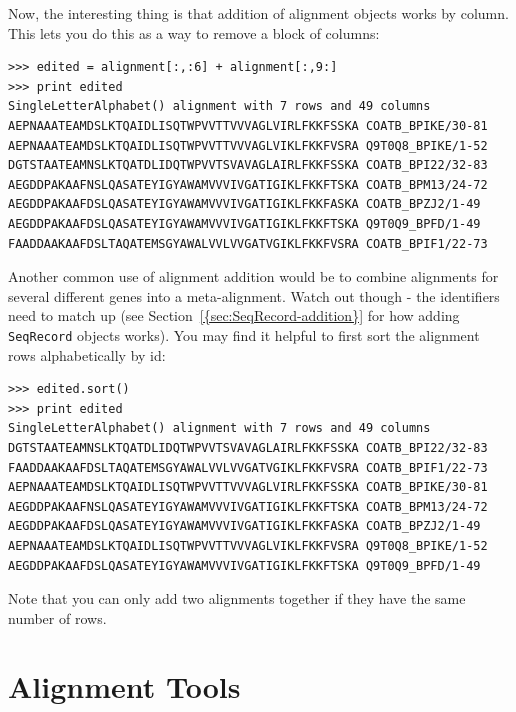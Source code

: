 \documentclass{report}
\begin{document}
\noindent Now, the interesting thing is that addition of alignment objects works
by column. This lets you do this as a way to remove a block of columns:

\begin{verbatim}
>>> edited = alignment[:,:6] + alignment[:,9:]
>>> print edited
SingleLetterAlphabet() alignment with 7 rows and 49 columns
AEPNAAATEAMDSLKTQAIDLISQTWPVVTTVVVAGLVIRLFKKFSSKA COATB_BPIKE/30-81
AEPNAAATEAMDSLKTQAIDLISQTWPVVTTVVVAGLVIKLFKKFVSRA Q9T0Q8_BPIKE/1-52
DGTSTAATEAMNSLKTQATDLIDQTWPVVTSVAVAGLAIRLFKKFSSKA COATB_BPI22/32-83
AEGDDPAKAAFNSLQASATEYIGYAWAMVVVIVGATIGIKLFKKFTSKA COATB_BPM13/24-72
AEGDDPAKAAFDSLQASATEYIGYAWAMVVVIVGATIGIKLFKKFASKA COATB_BPZJ2/1-49
AEGDDPAKAAFDSLQASATEYIGYAWAMVVVIVGATIGIKLFKKFTSKA Q9T0Q9_BPFD/1-49
FAADDAAKAAFDSLTAQATEMSGYAWALVVLVVGATVGIKLFKKFVSRA COATB_BPIF1/22-73
\end{verbatim}

Another common use of alignment addition would be to combine alignments for
several different genes into a meta-alignment. Watch out though - the identifiers
need to match up (see Section~\ref{{sec:SeqRecord-addition}} for how adding
\verb|SeqRecord| objects works). You may find it helpful to first sort the
alignment rows alphabetically by id:

\begin{verbatim}
>>> edited.sort()
>>> print edited
SingleLetterAlphabet() alignment with 7 rows and 49 columns
DGTSTAATEAMNSLKTQATDLIDQTWPVVTSVAVAGLAIRLFKKFSSKA COATB_BPI22/32-83
FAADDAAKAAFDSLTAQATEMSGYAWALVVLVVGATVGIKLFKKFVSRA COATB_BPIF1/22-73
AEPNAAATEAMDSLKTQAIDLISQTWPVVTTVVVAGLVIRLFKKFSSKA COATB_BPIKE/30-81
AEGDDPAKAAFNSLQASATEYIGYAWAMVVVIVGATIGIKLFKKFTSKA COATB_BPM13/24-72
AEGDDPAKAAFDSLQASATEYIGYAWAMVVVIVGATIGIKLFKKFASKA COATB_BPZJ2/1-49
AEPNAAATEAMDSLKTQAIDLISQTWPVVTTVVVAGLVIKLFKKFVSRA Q9T0Q8_BPIKE/1-52
AEGDDPAKAAFDSLQASATEYIGYAWAMVVVIVGATIGIKLFKKFTSKA Q9T0Q9_BPFD/1-49
\end{verbatim}

\noindent Note that you can only add two alignments together if they
have the same number of rows.

\section{Alignment Tools}
\label{sec:alignment-tools}
\end{document}
